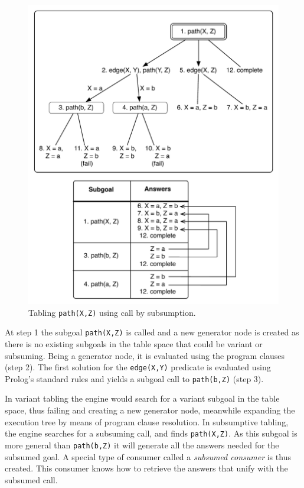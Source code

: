 \begin{figure}[ht]
\centering
  \includegraphics[scale=0.6]{tabling_path_sub.pdf}
\caption{Tabling \texttt{path(X,Z)} using call by subsumption.}
\label{fig:tabling_path_sub}
\end{figure}

At step 1 the subgoal \texttt{path(X,Z)} is called and a new generator node is created as there is no existing subgoals
in the table space that could be variant or subsuming. Being a generator node, it is evaluated using the program clauses
(step 2). The first solution for the \texttt{edge(X,Y)} predicate is evaluated using Prolog's standard rules and yields
a subgoal call to \texttt{path(b,Z)} (step 3).

In variant tabling the engine would search for a variant subgoal in the table space, thus failing and creating a
new generator node, meanwhile expanding the execution tree by means of program clause resolution. In subsumptive
tabling, the engine searches for a subsuming call, and finds \texttt{path(X,Z)}. As this subgoal is more general than
\texttt{path(b,Z)} it will generate all the answers needed for the subsumed goal. A special type of consumer called a
\textit{subsumed consumer} is thus created. This consumer knows how to retrieve the answers
that unify with the subsumed call.

